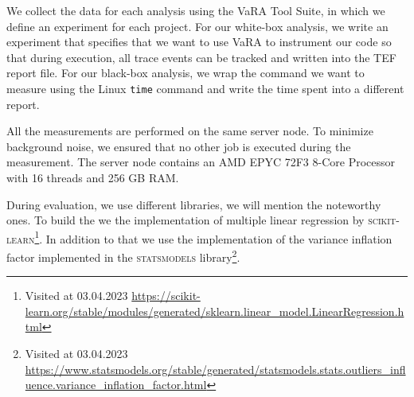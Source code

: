 We collect the data for each analysis using the VaRA Tool Suite, in which we define an experiment for each project. 
For our white-box analysis, we write an experiment that specifies that we want to use VaRA to instrument our code so that during execution, 
all trace events can be tracked and written into the TEF report file. For our black-box analysis, 
we wrap the command we want to measure using the Linux \texttt{time} command and write the time spent into a different report. 

All the measurements are performed on the same server node. To minimize background noise, we ensured that no other job is executed during the measurement. 
The server node contains an AMD EPYC 72F3 8-Core Processor with 16 threads and 256 GB RAM.

During evaluation, we use different libraries, we will mention the noteworthy ones.
To build the {\perfInfluenceModel} we the implementation of multiple linear regression by \textsc{scikit-learn}\footnote{Visited at 03.04.2023 \url{https://scikit-learn.org/stable/modules/generated/sklearn.linear_model.LinearRegression.html}}.
In addition to that we use the implementation of the variance inflation factor implemented in the \textsc{statsmodels} library\footnote{Visited at 03.04.2023 \url{https://www.statsmodels.org/stable/generated/statsmodels.stats.outliers_influence.variance_inflation_factor.html}}.
